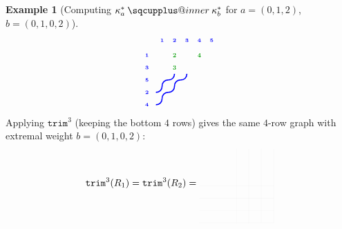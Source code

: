 \documentclass{amsart}
\makeatletter
\newcommand{\sqcupplus@inner}[2]{%
  \vcenter{\hbox{\ooalign{%
    \hfil$\m@th#1\sqcup$\hfil\cr
    \hfil\raisebox{0.15ex}{$\m@th#1\scriptscriptstyle+$}\hfil\cr
  }}}%
}
\newcommand{\sqcupplus}{\mathbin{\mathpalette\sqcupplus@inner\relax}}
\theoremstyle{definition}
\newtheorem{example}[lemma]{Example}
\theoremstyle{remark}
\numberwithin{equation}{subsection}
\newcommand{\trm}{\mathtt{trim}}
\makeatother
\begin{document}
\begin{example}[Computing $\kappa_a^*\sqcupplus\kappa_b^*$ for $a=(0,1,2)$, $b=(0,1,0,2)$]
$$\begin{tikzpicture}[scale=0.45, baseline=(current bounding box.center)]
  \draw[blue, line width=1.125pt] (0.8,2) .. controls (0.8,2.3) and (1,2.5) .. (1.3,2.5);
  \draw[blue, line width=1.125pt] (1.3,2.5) .. controls (1.6,2.5) and (1.8,2.7) .. (1.8,3);
  \draw[blue, line width=1.125pt] (1.8,2) .. controls (1.8,2.3) and (2,2.5) .. (2.3,2.5);
  \draw[blue, line width=1.125pt] (2.3,2.5) .. controls (2.6,2.5) and (2.8,2.7) .. (2.8,3);
  \draw[blue, line width=1.125pt] (0.3,1.5) .. controls (0.6,1.5) and (0.8,1.7) .. (0.8,2);
  \draw[blue, line width=1.125pt] (0.8,1) .. controls (0.8,1.3) and (1,1.5) .. (1.3,1.5);
  \draw[blue, line width=1.125pt] (1.3,1.5) .. controls (1.6,1.5) and (1.8,1.7) .. (1.8,2);
  \draw[blue, line width=1.125pt] (0.3,0.5) .. controls (0.6,0.5) and (0.8,0.7) .. (0.8,1);
  \node[font=\tiny\bfseries, text=blue, anchor=south] at (0.8,5.3) {1};
  \node[font=\tiny\bfseries, text=blue, anchor=south] at (1.8,5.3) {2};
  \node[font=\tiny\bfseries, text=blue, anchor=south] at (2.8,5.3) {3};
  \node[font=\tiny\bfseries, text=blue, anchor=south] at (3.8,5.3) {4};
  \node[font=\tiny\bfseries, text=blue, anchor=south] at (4.8,5.3) {5};
  \node[font=\tiny\bfseries, text=blue, anchor=east] at (0,4.5) {1};
  \node[font=\tiny\bfseries, text=blue, anchor=east] at (0,3.5) {3};
  \node[font=\tiny\bfseries, text=blue, anchor=east] at (0,2.5) {5};
  \node[font=\tiny\bfseries, text=blue, anchor=east] at (0,1.5) {2};
  \node[font=\tiny\bfseries, text=blue, anchor=east] at (0,0.5) {4};
  \node[font=\Large\bfseries, text=green!60!black, fill=white, inner sep=0.5pt, circle, transform shape] at (1.8,4.5) {2};
  \node[font=\Large\bfseries, text=green!60!black, fill=white, inner sep=0.5pt, circle, transform shape] at (3.8,4.5) {4};
  \node[font=\Large\bfseries, text=green!60!black, fill=white, inner sep=0.5pt, circle, transform shape] at (1.8,3.5) {3};
\end{tikzpicture}
$$
Applying $\trm^3$ (keeping the bottom $4$ rows) gives the same $4$-row graph with extremal weight $b=(0,1,0,2)$:
$$\trm^3(R_1)=\trm^3(R_2)=
\begin{tikzpicture}[scale=0.45, baseline=(current bounding box.center)]
  \draw[lightgray, very thin, opacity=0.3] (6.3,0) -- (0.3,0);
  \draw[lightgray, very thin, opacity=0.3] (6.3,0) -- (6.3,6);
  \draw[lightgray, very thin, opacity=0.3] (6.3,1) -- (0.3,1);
  \draw[lightgray, very thin, opacity=0.3] (5.3,0) -- (5.3,6);
  \draw[lightgray, very thin, opacity=0.3] (6.3,2) -- (0.3,2);
  \draw[lightgray, very thin, opacity=0.3] (4.3,0) -- (4.3,6);
  \draw[lightgray, very thin, opacity=0.3] (6.3,3) -- (0.3,3);
  \draw[lightgray, very thin, opacity=0.3] (3.3,0) -- (3.3,6);

\end{tikzpicture}$$
\end{example}
\end{document}
